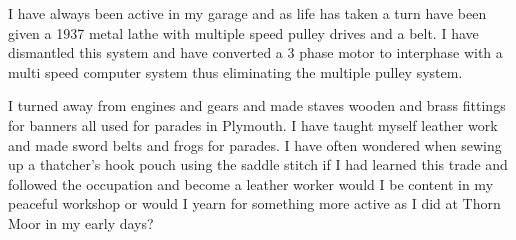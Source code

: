 
I have always been active in my garage and as life has taken a turn have been
given a 1937 metal lathe with multiple speed pulley drives and a belt. I have
dismantled this system and have converted a 3 phase motor to interphase with a
multi speed computer system thus eliminating the multiple pulley system.

I turned away from engines and gears and made staves wooden and brass fittings
for banners all used for parades in Plymouth. I have taught myself leather
work and made sword belts and frogs for parades. I have often wondered when
sewing up a thatcher's hook pouch using the saddle stitch if I had learned this
trade and followed the occupation and become a leather worker would I be
content in my peaceful workshop or would I yearn for something more active as I
did at Thorn Moor in my early days?

